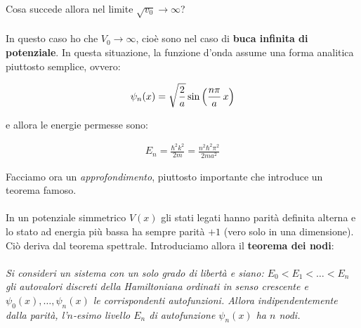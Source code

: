	Cosa succede allora nel limite $\sqrt{v_0} \to \infty$? 
	\\
	\\
	In questo caso ho che $V_0 \to \infty$, cioè sono nel caso di \textbf{buca infinita di potenziale}. In questa situazione, la funzione d'onda assume una forma analitica piuttosto semplice, ovvero:

\begin{align*}
	\psi_n(x) = \sqrt{\frac{2}{a}} \sin\qty(\frac{n\pi}{a} \, x)
\end{align*}

	e allora le energie permesse sono:
	
\begin{align*}
	E_n = \frac{\hbar^2k^2}{2m} = \frac{n^2 \hbar^2 \pi^2}{2ma^2}
\end{align*}

\begin{myapprf}
	Facciamo ora un \textit{approfondimento}, piuttosto importante che introduce un teorema famoso. 
	\\
	\\
	In un potenziale simmetrico $V(x)$ gli stati legati hanno parità definita alterna e lo stato ad energia più bassa ha sempre parità $+1$ (vero solo in una dimensione). Ciò deriva dal teorema spettrale. Introduciamo allora il \textbf{teorema dei nodi}:
	\\
	\\
	\textit{Si consideri un sistema con un solo grado di libertà e siano: $E_0 < E_1 < \ldots < E_n$ gli autovalori discreti della Hamiltoniana ordinati in senso crescente e $\psi_0(x), \ldots, \psi_n(x)$ le corrispondenti autofunzioni. Allora indipendentemente dalla parità, l'$n$-esimo livello $E_n$ di autofunzione $\psi_n(x)$ ha $n$ nodi.} 
	
\vspace{1em}
\begin{center}
\end{center}
\end{myapprf}

